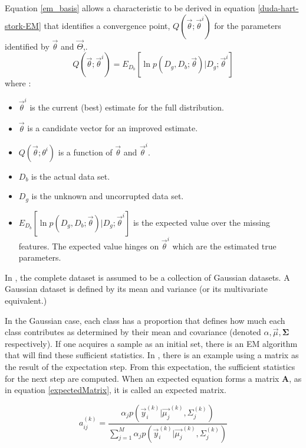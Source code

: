 \documentclass[]{article}
\begin{document}
Equation \ref{em_basis} allows a characteristic to be derived in equation \ref{duda-hart-stork-EM} that identifies a convergence point, $Q( \vec{\theta} ; \vec{\theta}^i)$ for the parameters identified by $\vec{\theta}$ and $\vec{\Theta}$,.
\begin{equation}
Q( \vec{\theta} ; \vec{\theta}^i) = E_{D_b} [ \ln p(D_g, D_b; \vec{\theta}) | D_g ; \vec{\theta}^i ] \label{duda-hart-stork-EM}
\end{equation}
where :
\begin{itemize}
	\item $\vec{\theta}^i$ is the current (best) estimate for the full distribution.  
	\item $\vec{\theta}$ is a candidate vector for an improved estimate.
	\item $Q(\vec{\theta} ; \theta^i)$ is a function of $\vec{\theta}$ and $\vec{\theta}^i$.
	\item $D_b$ is the actual data set.  
	\item $D_g$ is the unknown and uncorrupted data set.
	\item $E_{D_b} [ \ln p(D_g, D_b; \vec{\theta}) | D_g ; \vec{\theta}^i ] $ is the expected value over the missing features.  The expected value hinges on $\vec{\theta}^i$ which are the estimated true parameters.
\end{itemize}

 In \cite{yamazaki98introduction}, the complete dataset is assumed to be a collection of Gaussian datasets.   A Gaussian dataset is defined by its mean and variance (or its multivariate equivalent.)  

In the Gaussian case, each class has a proportion that defines how much each class contributes as determined by their mean and covariance (denoted $\alpha, \vec{\mu}, \mathbf{\Sigma}$ respectively).   If one acquires a sample as an initial set, there is an EM algorithm that will find these sufficient statistics. In \cite{yamazaki98introduction}, there is an example using a matrix as the result of the expectation step.  From this expectation, the sufficient statistics for the next step are computed.   When an expected equation forms a matrix $\mathbf{A}$, as in equation 
\ref{expectedMatrix}, it is called an expected matrix.

\begin{equation}
a_{ij}^{(k)}     = \frac {\alpha_j p(\vec{y}_i  ^{(k)}  | \vec{\mu_j} ^{(k)} , \Sigma_j ^{(k)}  )}{\sum_{j=1}^M \alpha_j p(\vec{y}_i  ^{(k)}  | \vec{\mu_j} ^{(k)} , \Sigma_j ^{(k)}  )} \label{expectedMatrix}
\end{equation}
\end{document}
